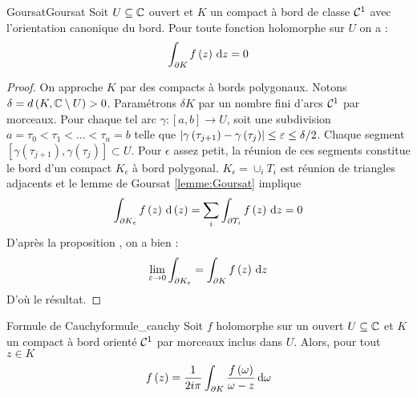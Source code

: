\documentclass{cours}
\begin{document}
\begin{théorème}{Goursat}{Goursat}
	Soit $U \subseteq \mathbb{C}$ ouvert et $K$ un compact à bord de classe $\mathcal{C}^{1}$ avec l'orientation canonique du bord. Pour toute fonction holomorphe sur $U$ on a : 
	\begin{equation*}
		\int_{\partial K}f\left(z\right){\rm \, d} z = 0
	\end{equation*}
\end{théorème}
\begin{proof}
    On approche $K$ par des compacts à bords polygonaux. Notons $\delta = d\left(K, \mathbb{C}\setminus U\right) > 0$. 
    Paramétrons $\delta K$ par un nombre fini d'arcs $\mathcal{C}^{1}$ par morceaux. Pour chaque tel arc $\gamma : \left[a, b\right] \to U$, soit une subdivision $a = \tau_{0} < \tau_{1} < \ldots < \tau_{n} = b$ telle que $\left|\gamma\left(\tau_{j + 1}\right) - \gamma\left(\tau_{j}\right)\right| \leq \varepsilon \leq \delta/2$. 
    Chaque segment $\left[\gamma\left(\tau_{j + 1}\right), \gamma\left(\tau_{j}\right)\right] \subset U$. 
    Pour $\epsilon$ assez petit, la réunion de ces segments constitue le bord d'un compact $K_{\epsilon}$ à bord polygonal. 
    $K_{\epsilon} = \cup_{i} T_{i}$ est réunion de triangles adjacents et le lemme de Goursat \ref{lemme:Goursat} implique 
    \begin{equation*}
        \int_{\partial K_{\varepsilon}}f\left(z\right){\rm \, d}\left(z\right) = \sum_{i}\int_{\partial T_{i}} f\left(z\right) {\rm \, d} z = 0
    \end{equation*}
    D'après la proposition , on a bien : 
    \begin{equation*}
        \lim_{\varepsilon \to 0}\int_{\partial K_{\varepsilon}} = \int_{\partial K}f\left(z\right){\rm \, d} z
    \end{equation*}
    D'où le résultat. 
\end{proof}

\begin{théorème}{Formule de Cauchy}{formule_cauchy}
    Soit $f$ holomorphe sur un ouvert $U \subseteq \mathbb{C}$ et $K$ un compact à bord orienté $\mathcal{C}^{1}$ par morceaux inclus dans $U$. Alors, pour tout $z \in K$ 
    \begin{equation*}
        f\left(z\right) = \frac{1}{2i\pi}\int_{\partial K}\frac{f\left(\omega\right)}{\omega -  z}{\rm \, d} \omega
    \end{equation*}
\end{théorème}
\end{document}
